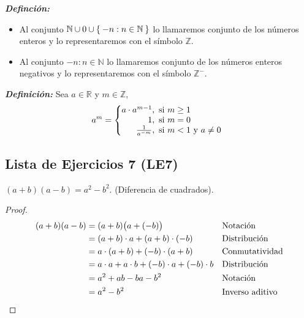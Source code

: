 \documentclass[11pt]{article}
\newcommand{\N}{\mathbb{N}}
\newcommand{\Z}{\mathbb{Z}}
\newcommand{\R}{\mathbb{R}}
\newcommand{\bfit}[1]{\textbf{\textit{#1}}}
\let\set\Set
\begin{document}
  \bfit{Definción:} \begin{itemize}
    \item Al conjunto $\N \cup {0} \cup \set{-n: n\in \N}$ lo llamaremos conjunto de los números enteros y lo representaremos con el símbolo $\Z$.
    \item Al conjunto ${-n: n\in \N}$ lo llamaremos conjunto de los números enteros negativos y lo representaremos con el símbolo $\Z^-$.
   \end{itemize}
   

   \bfit{Definición:}  Sea $a\in \R$ y $m\in \Z$,
 \[
  a^m = \left\{
 \begin{array}{@{}r@{\thinspace}l}
  a\cdot a^{m-1}, &  \ \text{si}  \ m \geq 1\\
  1, &  \ \text{si}  \ m = 0\\
  \frac{1}{a^{-m}}, &  \ \text{si}  \ m < 1 \ \text{y} \ a\neq 0
 \end{array} \right. \]

\subsection*{Lista de Ejercicios 7 (LE7)}

$(a+b)(a-b)=a^2-b^2$. (Diferencia de cuadrados).
\begin{proof} 
 \begin{align*}
 (a+b)(a-b) &= (a+b)\bigl(a+(-b)\bigr) && \text{Notación}\\
 &= (a+b)\cdot a + (a+b)\cdot (-b) && \text{Distribución}\\
 &= a\cdot (a+b) + (-b)\cdot (a+b) && \text{Conmutatividad}\\
 &= a\cdot a + a\cdot b + (-b)\cdot a + (-b) \cdot b && \text{Distribución}\\
 &= a^2+ ab -ba -b^2 && \text{Notación}\\
 &=a^2-b^2 && \text{Inverso aditivo} \qedhere
 \end{align*} 
\end{proof}
\end{document}
